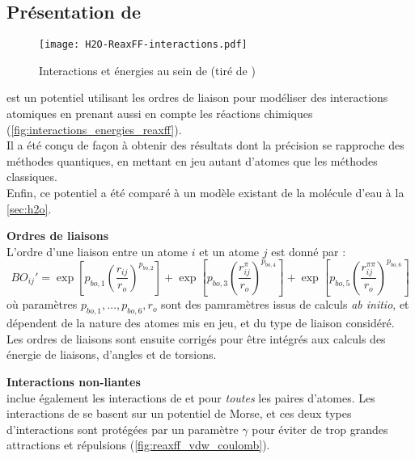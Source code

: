     \subsection{Présentation de \reaxff{}} \label{sec:reaxff}

\begin{figure}[h!]
    \centering
    \texttt{[image: H2O-ReaxFF-interactions.pdf]}
    \caption{Interactions et énergies au sein de \reaxff{} (tiré de \cite{russo_atomistic-scale_2011})}
    \label{fig:interactions_energies_reaxff}
\end{figure}

\reaxff{}\cite{russo_atomistic-scale_2011}\cite{senftle_reaxff_2016} est un potentiel utilisant les ordres de liaison pour modéliser des interactions atomiques en prenant aussi en compte les réactions chimiques (\autoref{fig:interactions_energies_reaxff}).\\
Il a été conçu de façon à obtenir des résultats dont la précision se rapproche des méthodes quantiques, en mettant en jeu autant d'atomes que les méthodes classiques.\\
Enfin, ce potentiel a été comparé à un modèle existant de la molécule d'eau à la \autoref{sec:h2o}.

\textbf{Ordres de liaisons}\\
L'ordre d'une liaison entre un atome $i$ et un atome $j$ est donné par :
\begin{equation}
    BO_{ij}' = \exp \left[p_{bo, 1} \left(\frac{r_{ij}}{r_o}\right)^{p_{bo,2}}\right] + \exp \left[p_{bo,3} \left(\frac{r_{ij}^\pi}{r_o}\right)^{p_{bo,4}}\right] + \exp \left[p_{bo,5} \left(\frac{r_{ij}^{\pi\pi}}{r_o}\right)^{p_{bo,6}}\right]
    \label{eq:ordres_liaisons_reaxff}
\end{equation}
où paramètres $p_{bo,1}, \dots, p_{bo,6}, r_o$ sont des pamramètres issus de calculs \textit{ab initio}, et dépendent de la nature des atomes mis en jeu, et du type de liaison considéré. Les ordres de liaisons sont ensuite corrigés pour être intégrés aux calculs des énergie de liaisons, d'angles et de torsions.

\textbf{Interactions non-liantes}\\
\reaxff{} inclue également les interactions de \vdw{} et \coulomb{} pour \emph{toutes} les paires d'atomes. Les interactions de \vdw{} se basent sur un potentiel de Morse, et ces deux types d'interactions sont protégées par un paramètre $\gamma$ pour éviter de trop grandes attractions et répulsions (\autoref{fig:reaxff_vdw_coulomb}).

